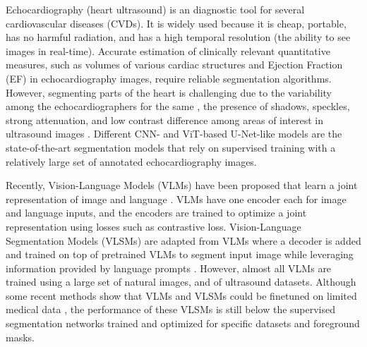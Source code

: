 \documentclass[runningheads]{llncs}
\begin{document}
Echocardiography (heart ultrasound) is an  diagnostic tool for several cardiovascular diseases (CVDs).
It is widely used because it is cheap, portable, has no harmful radiation, and has a high temporal resolution (the ability to see  images in real-time).
Accurate estimation of clinically relevant quantitative measures, such as volumes of various cardiac structures and Ejection Fraction (EF) in echocardiography images, require reliable segmentation algorithms.
However, segmenting  parts of the heart is challenging due to the variability among the echocardiographers for the same , the presence of shadows, speckles, strong attenuation, and low contrast difference among areas of interest in ultrasound images \cite{avola2021ultrasound}.
Different CNN- and ViT-based \cite{dosovitskiy2020image} U-Net-like models \cite{deng2021transbridge,hatamizadeh2022unetr,isensee2021nnu,ronneberger2015u} are the state-of-the-art segmentation models that rely on supervised training with a relatively large set of annotated echocardiography images.

Recently, Vision-Language Models (VLMs) \cite{furst2022cloob,huang2020pixel,jia2021scaling,li2021supervision,radford2021learning,singh2022flava,zou2023generalized} have been proposed that learn a joint representation of image and language \cite{lin2014microsoft,plummer2015flickr30k,schuhmann2022laion,sharma2018conceptual}.
VLMs have one encoder each for image and language inputs, and the encoders are trained  to optimize a joint representation using losses such as contrastive loss. 
Vision-Language Segmentation Models (VLSMs) are adapted from VLMs where a decoder is added and trained on top of pretrained VLMs to segment  input image while leveraging information provided by language prompts \cite{luddecke2022image,rao2022denseclip,wang2022cris}.
However, almost all VLMs are trained using a large set of natural images, and  of ultrasound datasets.
Although some recent methods show that VLMs and VLSMs could be finetuned on limited medical data \cite{qin2022medical}, the performance of these VLSMs is still below the supervised segmentation networks trained and optimized for specific datasets and foreground masks.
\end{document}
